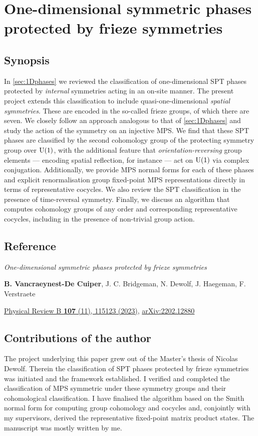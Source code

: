 \chapter{One-dimensional symmetric phases protected by frieze symmetries}\label{app:frieze}
\section{Synopsis}
In \cref{sec:1Dphases} we reviewed the classification of one-dimensional SPT phases protected by \emph{internal} symmetries acting in an on-site manner. The present project extends this classification to include quasi-one-dimensional \emph{spatial symmetries}. These are encoded in the so-called frieze groups, of which there are seven. We closely follow an approach analogous to that of \cref{sec:1Dphases} and study the action of the symmetry on an injective MPS. We find that these SPT phases are classified by the second cohomology group of the protecting symmetry group over ${\rm U}(1)$, with the additional feature that \emph{orientation-reversing} group elements --- encoding spatial reflection, for instance --- act on ${\rm U}(1)$ via complex conjugation. Additionally, we provide MPS normal forms for each of these phases and explicit renormalisation group fixed-point MPS representations directly in terms of representative cocycles. We also review the SPT classification in the presence of time-reversal symmetry. Finally, we discuss an algorithm that computes cohomology groups of any order and corresponding representative cocycles, including in the presence of non-trivial group action.
\newpage
\section{Reference}
\textit{One-dimensional symmetric phases protected by frieze symmetries} \par\noindent
\textbf{B. Vancraeynest-De Cuiper}, J. C. Bridgeman, N. Dewolf, J. Haegeman, F. Verstraete \par\noindent
\href{https://doi.org/10.1103/PhysRevB.107.115123}{Physical Review B \textbf{107} (11), 115123 (2023)}, \href{https://doi.org/10.48550/arXiv.2202.12880}{arXiv:2202.12880}
\section{Contributions of the author}
The project underlying this paper grew out of the Master's thesis of Nicolas Dewolf. Therein the classification of SPT phases protected by frieze symmetries was initiated and the framework established. I verified and completed the classification of MPS symmetric under these symmetry groups and their cohomological classification. I have finalised the algorithm based on the Smith normal form for computing group cohomology and cocycles and, conjointly with my supervisors, derived the representative fixed-point matrix product states. The manuscript was mostly written by me.

